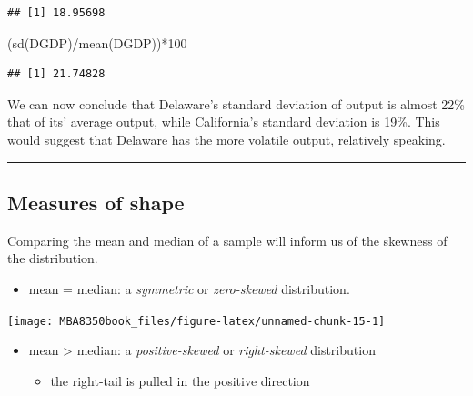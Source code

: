 \documentclass[
]{book}
\newenvironment{Shaded}{\begin{snugshade}}{\end{snugshade}}
\newcommand{\DecValTok}[1]{\textcolor[rgb]{0.00,0.00,0.81}{#1}}
\newcommand{\FunctionTok}[1]{\textcolor[rgb]{0.00,0.00,0.00}{#1}}
\newcommand{\NormalTok}[1]{#1}
\newcommand{\SpecialCharTok}[1]{\textcolor[rgb]{0.00,0.00,0.00}{#1}}
\providecommand{\tightlist}{%
  \setlength{\itemsep}{0pt}\setlength{\parskip}{0pt}}
\begin{document}
\begin{verbatim}
## [1] 18.95698
\end{verbatim}

\begin{Shaded}
\begin{Highlighting}[]
\NormalTok{(}\FunctionTok{sd}\NormalTok{(DGDP)}\SpecialCharTok{/}\FunctionTok{mean}\NormalTok{(DGDP))}\SpecialCharTok{*}\DecValTok{100}
\end{Highlighting}
\end{Shaded}

\begin{verbatim}
## [1] 21.74828
\end{verbatim}

We can now conclude that Delaware's standard deviation of output is almost 22\% that of its' average output, while California's standard deviation is 19\%. This would suggest that Delaware has the more volatile output, relatively speaking.

\begin{center}\rule{0.5\linewidth}{0.5pt}\end{center}

\hypertarget{measures-of-shape}{%
\subsection{Measures of shape}\label{measures-of-shape}}

Comparing the mean and median of a sample will inform us of the skewness of the distribution.

\begin{itemize}
\tightlist
\item
  mean = median: a \emph{symmetric} or \emph{zero-skewed} distribution.
\end{itemize}

\begin{center}\texttt{[image: MBA8350book\_files/figure-latex/unnamed-chunk-15-1]} \end{center}

\begin{itemize}
\tightlist
\item
  mean \textgreater{} median: a \emph{positive-skewed} or \emph{right-skewed} distribution

  \begin{itemize}
  \tightlist
  \item
    the right-tail is pulled in the positive direction
  \end{itemize}
\end{itemize}
\end{document}
